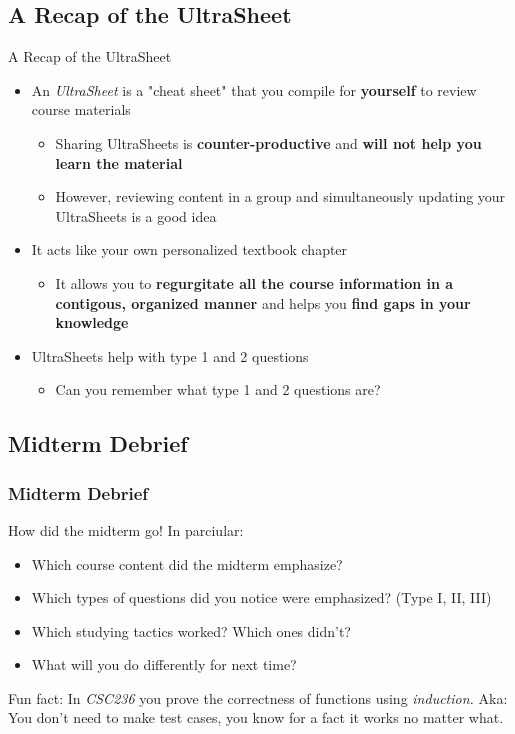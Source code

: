 \documentclass[hyperref={colorlinks,citecolor=blue,linkcolor=blue,urlcolor=blue}]{beamer}
\begin{document}
\subsection{A Recap of the UltraSheet\texttrademark{}}
\begin{frame}{A Recap of the UltraSheet\texttrademark{}}
  \begin{itemize}
    \item An \textit{UltraSheet\texttrademark{}} is a "cheat sheet" that you compile for \textbf{yourself} to review course materials 
    \begin{itemize}
      \item Sharing UltraSheets\texttrademark{} is \textbf{counter-productive} and \textbf{will not help you learn the material}
      \item However, reviewing content in a group and simultaneously updating your UltraSheets\texttrademark{} is a good idea
    \end{itemize}
    \item It acts like your own personalized textbook chapter
    \begin{itemize}
      \item It allows you to \textbf{regurgitate all the course information in a contigous, organized manner} and helps you \textbf{find gaps in your knowledge}
    \end{itemize}
    \item UltraSheets\texttrademark{} help with type 1 and 2 questions 
    \begin{itemize}
      \item Can you remember what type 1 and 2 questions are?
    \end{itemize}
  \end{itemize}

\end{frame}

\subsection{Midterm Debrief}
\begin{frame}
  \frametitle{Midterm Debrief}
  How did the midterm go! In parciular:
  \begin{itemize}
    \item Which course content did the midterm emphasize?
    \item Which types of questions did you notice were emphasized? (Type I, II, III)
    \item Which studying tactics worked? Which ones didn't?
    \item What will you do differently for next time?
  \end{itemize}

  Fun fact: In \textit{CSC236} you prove the correctness of functions using \textit{induction.} Aka: You don't need to make test cases, you know for a fact it works no matter what. 
\end{frame}
\end{document}
